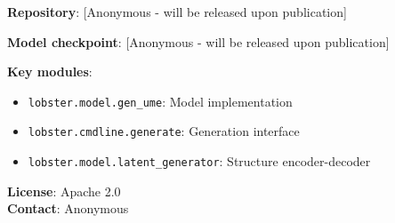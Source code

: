 \documentclass[11pt,a4paper]{article}
\begin{document}
\textbf{Repository}: [Anonymous - will be released upon publication]

\textbf{Model checkpoint}: [Anonymous - will be released upon publication]

\textbf{Key modules}:
\begin{itemize}
\item \texttt{lobster.model.gen\_ume}: Model implementation
\item \texttt{lobster.cmdline.generate}: Generation interface
\item \texttt{lobster.model.latent\_generator}: Structure encoder-decoder
\end{itemize}

\vspace{1cm}
\noindent\textbf{License}: Apache 2.0 \\
\textbf{Contact}: Anonymous
\end{document}

